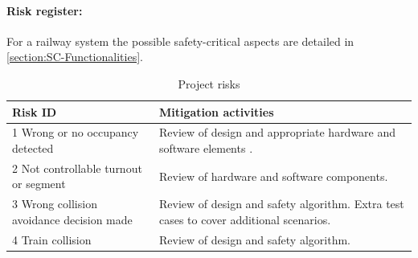 \paragraph{Risk register:}
For a railway system the possible safety-critical aspects are detailed in \autoref{section:SC-Functionalities}.
\begin{table}[h]
\caption{Project risks}
\label{table:Risks-Safety-critical}
	\begin{center}
		\renewcommand{\arraystretch}{1.8}
		\begin{tabu} 
			to 0.9 \textwidth
			{ X[l] X[l] }
			\toprule
			Risk ID                                                                                     & Mitigation activities                                                                 \\ \midrule
			1 Wrong or no occupancy detected                                                            & Review of design and appropriate hardware and software elements .                     \\
			2 Not controllable turnout  or segment                                                      & Review of hardware and software components.                                            \\
			3 Wrong collision avoidance decision made                                                   & Review of design and safety algorithm. Extra test cases to cover additional scenarios. \\
			4 Train collision                                                                           & Review of design and safety algorithm.                                                \\ \bottomrule
		\end{tabu}
	\end{center}
\end{table} 
